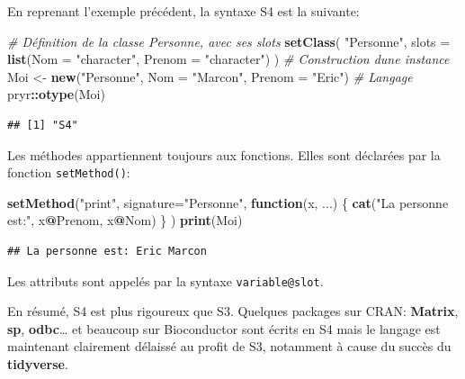 \documentclass[
  12pt,
  french,
  a4paper,
  extrafontsizes,onecolumn,openright
  ]{memoir}
\newenvironment{Shaded}{\begin{snugshade}}{\end{snugshade}}
\newcommand{\AttributeTok}[1]{\textcolor[rgb]{0.13,0.29,0.53}{#1}}
\newcommand{\CommentTok}[1]{\textcolor[rgb]{0.56,0.35,0.01}{\textit{#1}}}
\newcommand{\ControlFlowTok}[1]{\textcolor[rgb]{0.13,0.29,0.53}{\textbf{#1}}}
\newcommand{\FunctionTok}[1]{\textcolor[rgb]{0.13,0.29,0.53}{\textbf{#1}}}
\newcommand{\NormalTok}[1]{#1}
\newcommand{\OtherTok}[1]{\textcolor[rgb]{0.56,0.35,0.01}{#1}}
\newcommand{\SpecialCharTok}[1]{\textcolor[rgb]{0.81,0.36,0.00}{\textbf{#1}}}
\newcommand{\StringTok}[1]{\textcolor[rgb]{0.31,0.60,0.02}{#1}}
\begin{document}
En reprenant l'exemple précédent, la syntaxe S4 est la suivante:

\scriptsize

\begin{Shaded}
\begin{Highlighting}[]
\CommentTok{\# Définition de la classe Personne, avec ses slots}
\FunctionTok{setClass}\NormalTok{(}
  \StringTok{"Personne"}\NormalTok{,  }
  \AttributeTok{slots =} \FunctionTok{list}\NormalTok{(}\AttributeTok{Nom =} \StringTok{"character"}\NormalTok{, }\AttributeTok{Prenom =} \StringTok{"character"}\NormalTok{)}
\NormalTok{)}
\CommentTok{\# Construction d\textquotesingle{}une instance}
\NormalTok{Moi }\OtherTok{\textless{}{-}} \FunctionTok{new}\NormalTok{(}\StringTok{"Personne"}\NormalTok{, }\AttributeTok{Nom =} \StringTok{"Marcon"}\NormalTok{, }\AttributeTok{Prenom =} \StringTok{"Eric"}\NormalTok{)}
\CommentTok{\# Langage}
\NormalTok{pryr}\SpecialCharTok{::}\FunctionTok{otype}\NormalTok{(Moi)}
\end{Highlighting}
\end{Shaded}

\begin{verbatim}
## [1] "S4"
\end{verbatim}

\normalsize

Les méthodes appartiennent toujours aux fonctions.
Elles sont déclarées par la fonction \texttt{setMethod()}:

\scriptsize

\begin{Shaded}
\begin{Highlighting}[]
\FunctionTok{setMethod}\NormalTok{(}\StringTok{"print"}\NormalTok{,}
  \AttributeTok{signature=}\StringTok{"Personne"}\NormalTok{,}
  \ControlFlowTok{function}\NormalTok{(x, ...) \{}
    \FunctionTok{cat}\NormalTok{(}\StringTok{"La personne est:"}\NormalTok{, x}\SpecialCharTok{@}\NormalTok{Prenom, x}\SpecialCharTok{@}\NormalTok{Nom) }
\NormalTok{  \}}
\NormalTok{)}
\FunctionTok{print}\NormalTok{(Moi)}
\end{Highlighting}
\end{Shaded}

\begin{verbatim}
## La personne est: Eric Marcon
\end{verbatim}

\normalsize

Les attributs sont appelés par la syntaxe \texttt{variable@slot}.

En résumé, S4 est plus rigoureux que S3.
Quelques packages sur CRAN: \textbf{Matrix}, \textbf{sp}, \textbf{odbc}\ldots{} et beaucoup sur Bioconductor sont écrits en S4 mais le langage est maintenant clairement délaissé au profit de S3, notamment à cause du succès du \textbf{tidyverse}.
\end{document}
